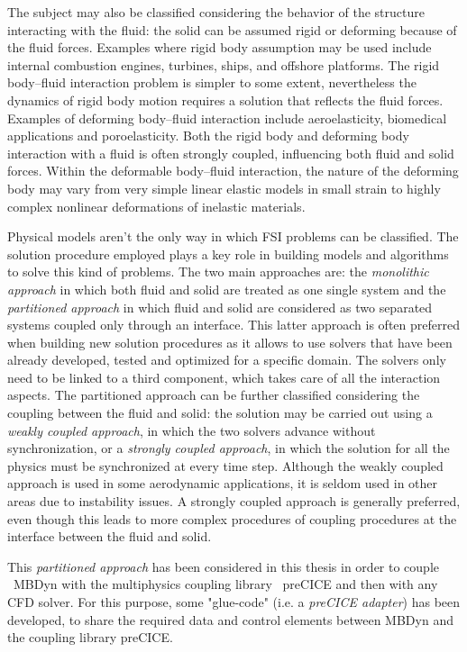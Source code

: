 The subject may also be classified considering the behavior of the structure interacting with the fluid: the solid can be assumed rigid or deforming because of the fluid forces. Examples where rigid body assumption may be used include internal combustion engines, turbines, ships, and offshore platforms. The rigid body–fluid interaction problem is simpler to some extent, nevertheless the dynamics of rigid body motion requires a solution that reflects the fluid forces.
Examples of deforming body–fluid interaction include aeroelasticity, biomedical applications and poroelasticity. Both the rigid body and deforming body interaction with a fluid is often strongly coupled, influencing both fluid and solid forces. Within the deformable body–fluid interaction, the nature of the deforming body may vary from very simple linear elastic models in small strain to highly complex nonlinear deformations of inelastic materials.


Physical models aren't the only way in which FSI problems can be classified. The solution procedure employed plays a key role in building models and algorithms to solve this kind of problems. The two main approaches are: the \textit{monolithic approach} in which both fluid and solid are treated as one single system and the \textit{partitioned approach} in which fluid and solid are considered as two separated systems coupled only through an interface. This latter approach is often preferred when building new solution procedures as it allows to use solvers that have been already developed, tested and optimized for a specific domain. The solvers only need to be linked to a third component, which takes care of all the interaction aspects.
The partitioned approach can be further classified considering the coupling between the fluid and solid: the solution may be carried out using a \textit{weakly coupled approach}, in which the two solvers advance without synchronization, or a \textit{strongly coupled approach}, in which the solution for all the physics must be synchronized at every time step. Although the weakly coupled approach is used in some aerodynamic applications, it is seldom used in other areas due to instability issues. A strongly coupled approach is generally preferred, even though this leads to more complex procedures of coupling procedures at the interface between the fluid and solid.

 This \textit{partitioned approach} has been considered in this thesis in order to couple ~\ac{MBDyn} with the multiphysics coupling library ~\ac{preCICE} and then with any CFD solver. For this purpose, some "glue-code" (i.e. a \textit{preCICE adapter}) has been developed, to share the required data and control elements between MBDyn and the coupling library preCICE.

